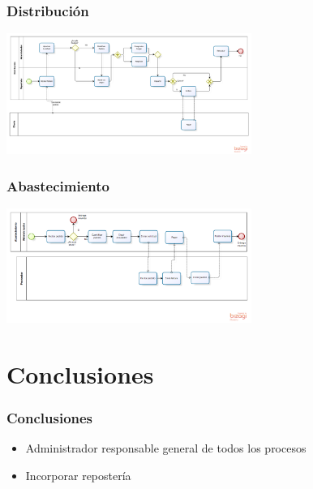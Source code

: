 \documentclass[10pt,letterpaper]{beamer}
\begin{document}
\begin{frame}
\frametitle{Distribución}
\begin{center}
\includegraphics[width=8cm]{./imagenes/Distribucion.png}
\end{center}
\end{frame}

\begin{frame}
\frametitle{Abastecimiento}
\begin{center}
\includegraphics[width=8cm]{./imagenes/Abastecimiento.png}
\end{center}
\end{frame}

\section{Conclusiones}
\begin{frame}
\frametitle{Conclusiones}
\begin{itemize}
\item Administrador responsable general de todos los procesos
\item Incorporar repostería
\end{itemize}
\end{frame}
\end{document}

